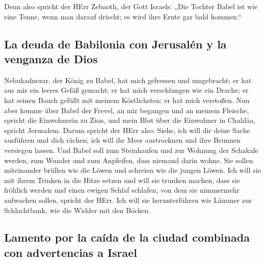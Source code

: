  Denn also spricht der HErr Zebaoth, der Gott Israels:
„Die Tochter Babel ist wie eine Tenne, wenn man darauf drischt; es wird
ihre Ernte gar bald kommen.``

\hypertarget{la-deuda-de-babilonia-con-jerusaluxe9n-y-la-venganza-de-dios}{%
\subsection{La deuda de Babilonia con Jerusalén y la venganza de
Dios}\label{la-deuda-de-babilonia-con-jerusaluxe9n-y-la-venganza-de-dios}}

 Nebukadnezar, der König zu Babel, hat mich gefressen und
umgebracht; er hat aus mir ein leeres Gefäß gemacht; er hat mich
verschlungen wie ein Drache; er hat seinen Bauch gefüllt mit meinem
Köstlichsten; er hat mich verstoßen.  Nun aber komme über
Babel der Frevel, an mir begangen und an meinem Fleische, spricht die
Einwohnerin zu Zion, und mein Blut über die Einwohner in Chaldäa,
spricht Jerusalem.  Darum spricht der HErr also: Siehe,
ich will dir deine Sache ausführen und dich rächen; ich will ihr Meer
austrocknen und ihre Brunnen versiegen lassen.  Und Babel
soll zum Steinhaufen und zur Wohnung der Schakale werden, zum Wunder und
zum Anpfeifen, dass niemand darin wohne.  Sie sollen
miteinander brüllen wie die Löwen und schreien wie die jungen Löwen.
 Ich will sie mit ihrem Trinken in die Hitze setzen und
will sie trunken machen, dass sie fröhlich werden und einen ewigen
Schlaf schlafen, von dem sie nimmermehr aufwachen sollen, spricht der
HErr.  Ich will sie herunterführen wie Lämmer zur
Schlachtbank, wie die Widder mit den Böcken.

\hypertarget{lamento-por-la-cauxedda-de-la-ciudad-combinada-con-advertencias-a-israel}{%
\subsection{Lamento por la caída de la ciudad combinada con advertencias
a
Israel}\label{lamento-por-la-cauxedda-de-la-ciudad-combinada-con-advertencias-a-israel}}

